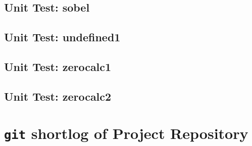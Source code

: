 \subsection*{Unit Test: sobel}

 \clearpage
\subsection*{Unit Test: undefined1}

 \clearpage
\subsection*{Unit Test: zerocalc1}

 \clearpage
\subsection*{Unit Test: zerocalc2}

 \clearpage

\section{\texttt{git} shortlog of Project Repository}

